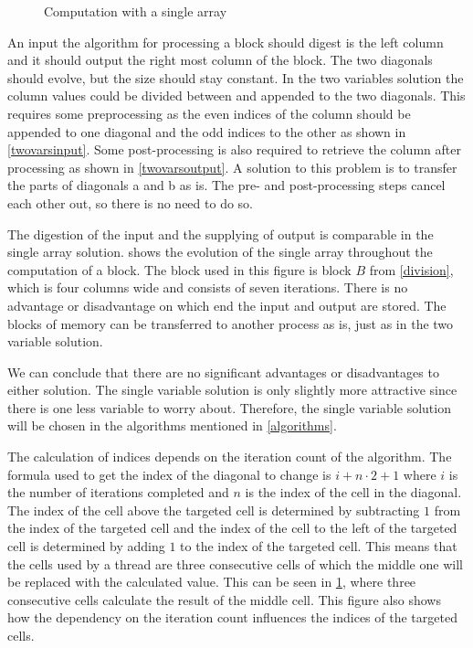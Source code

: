 \begin{figure}[ht]
    \centering
    
    \caption{Computation with a single array} \label{singlevar}
\end{figure}

An input the algorithm for processing a block should digest is the left column and it should output the right most column of the block.
The two diagonals should evolve, but the size should stay constant.
In the two variables solution the column values could be divided between and appended to the two diagonals.
This requires some preprocessing as the even indices of the column should be appended to one diagonal and the odd indices to the other as shown in \cref{twovarsinput}.
Some post-processing is also required to retrieve the column after processing as shown in \cref{twovarsoutput}.
A solution to this problem is to transfer the parts of diagonals a and b as is.
The pre- and post-processing steps cancel each other out, so there is no need to do so.

The digestion of the input and the supplying of output is comparable in the single array solution.
 shows the evolution of the single array throughout the computation of a block.
The block used in this figure is block $B$ from \cref{division}, which is four columns wide and consists of seven iterations.
There is no advantage or disadvantage on which end the input and output are stored.
The blocks of memory can be transferred to another process as is, just as in the two variable solution.

We can conclude that there are no significant advantages or disadvantages to either solution.
The single variable solution is only slightly more attractive since there is one less variable to worry about.
Therefore, the single variable solution will be chosen in the algorithms mentioned in \cref{algorithms}.

The calculation of indices depends on the iteration count of the algorithm.
The formula used to get the index of the diagonal to change is $i + n \cdot 2 + 1$ where $i$ is the number of iterations completed and $n$ is the index of the cell in the diagonal.
The index of the cell above the targeted cell is determined by subtracting $1$ from the index of the targeted cell and the index of the cell to the left of the targeted cell is determined by adding $1$ to the index of the targeted cell.
This means that the cells used by a thread are three consecutive cells of which the middle one will be replaced with the calculated value.
This can be seen in \cref{singlevar}, where three consecutive cells calculate the result of the middle cell.
This figure also shows how the dependency on the iteration count influences the indices of the targeted cells.

